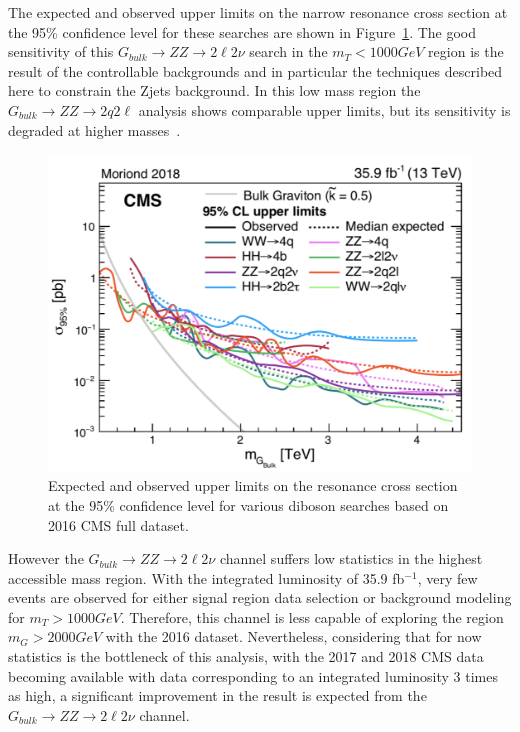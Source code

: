 The expected and observed upper limits on the narrow resonance cross section at the 95\% confidence level for these searches are shown in Figure~\ref{fig:sum_bulkGlimits}. The good sensitivity of this $G_{bulk}\rightarrow ZZ\rightarrow 2\ell 2\nu$ search in the $m_T < 1000 GeV$ region is the result of the controllable backgrounds and in particular the techniques described here to constrain the Zjets background. In this low mass region the $G_{bulk}\rightarrow ZZ\rightarrow 2q 2\ell$ analysis shows comparable upper limits, but its sensitivity is degraded at higher masses~\cite{sum_zzqqll}.
\begin{figure}[htbp]
\begin{center}
\includegraphics[width=0.9\linewidth]{figures/sum_bulkGlimits.pdf}
\caption{Expected and observed upper limits on the resonance cross section at the 95\% confidence level for various diboson searches based on 2016 CMS full dataset.}
\label{fig:sum_bulkGlimits}
\end{center}
\end{figure}

\vspace{0.3cm}
However the $G_{bulk}\rightarrow ZZ\rightarrow 2\ell 2\nu$ channel suffers low statistics in the highest accessible mass region. With the integrated luminosity of 35.9 fb$^{-1}$, very few events are observed for either signal region data selection or background modeling for $m_T >1000 GeV$. Therefore, this channel is less capable of exploring the region $m_G >2000GeV$ with the 2016 dataset. Nevertheless, considering that for now statistics is the bottleneck of this analysis, with the 2017 and 2018 CMS data becoming available with data corresponding to an integrated luminosity 3 times as high, a significant improvement in the result is expected from the $G_{bulk}\rightarrow ZZ\rightarrow 2\ell 2\nu$ channel.
